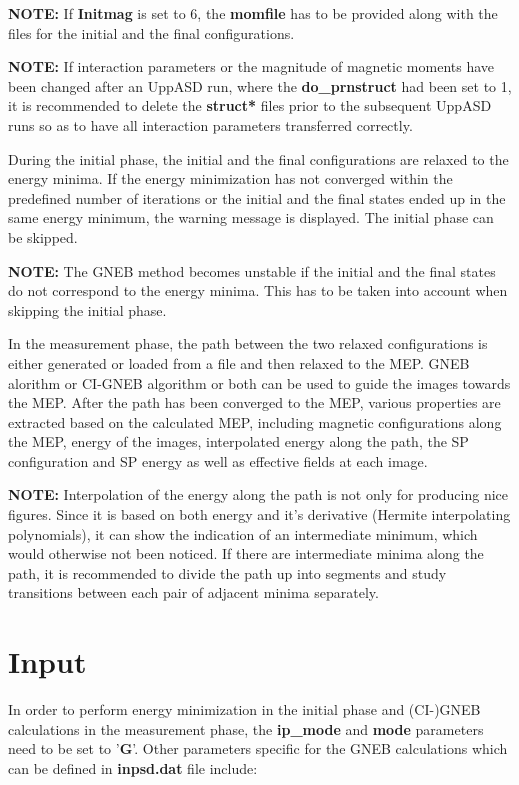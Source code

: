 \documentclass{article}
\begin{document}
{\bf NOTE:} If {\bf Initmag} is set to 6, the {\bf momfile} has to be provided along with the files for the initial and the final configurations.

{\bf NOTE:} If interaction parameters or the magnitude of magnetic moments have been changed after an UppASD run, where the {\bf do\_prnstruct} had been set to 1, it is recommended to delete the {\bf struct*} files prior to the subsequent UppASD runs so as to have all interaction parameters transferred correctly.

During the initial phase, the initial and the final configurations are relaxed to the energy minima. If the energy minimization has not converged within the predefined number of iterations or the initial and the final states ended up in the same energy minimum, the warning message is displayed. The initial phase can be skipped.

{\bf NOTE:} The GNEB method becomes unstable if the initial and the final states do not correspond to the energy minima. This has to be taken into account when skipping the initial phase.

In the measurement phase, the path between the two relaxed configurations is either generated or loaded from a file and then relaxed to the MEP. GNEB alorithm or CI-GNEB algorithm or both can be used to guide the images towards the MEP. After the path has been converged to the MEP, various properties are extracted based on the calculated MEP, including magnetic configurations along the MEP, energy of the images, interpolated energy along the path, the SP configuration and SP energy as well as effective fields at each image.

{\bf NOTE:} Interpolation of the energy along the path is not only for producing nice figures. Since it is based on both energy and it's derivative (Hermite interpolating polynomials), it can show the indication of an intermediate minimum, which would otherwise not been noticed. If there are intermediate minima along the path, it is recommended to divide the path up into segments and study transitions between each pair of adjacent minima separately.


\section{Input}

In order to perform energy minimization in the initial phase and (CI-)GNEB calculations in the measurement phase, the {\bf ip\_mode} and {\bf mode} parameters need to be set to '{\bf G}'. Other parameters specific for the GNEB calculations which can be defined in {\bf inpsd.dat} file include:
\end{document}
